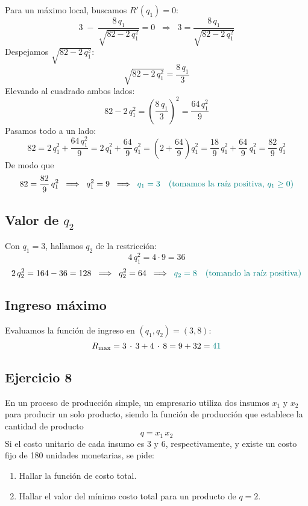 \documentclass{article}
\begin{document}
Para un máximo local, buscamos \(R'(q_1) = 0\):
\[
3 \;-\; \frac{8\,q_1}{\sqrt{82 - 2\,q_1^2}} = 0
\;\;\Longrightarrow\;\;
3 = \frac{8\,q_1}{\sqrt{82 - 2\,q_1^2}}
\]
Despejamos \(\sqrt{82 - 2\,q_1^2}\):
\[
\sqrt{82 - 2\,q_1^2} 
= \frac{8\,q_1}{3}
\]
Elevando al cuadrado ambos lados:
\[
82 - 2\,q_1^2 
= \left(\frac{8\,q_1}{3}\right)^2
= \frac{64\,q_1^2}{9}
\]
Pasamos todo a un lado:
\[
82 
= 2\,q_1^2 + \frac{64\,q_1^2}{9}
= 2\,q_1^2 + \frac{64}{9}\,q_1^2
= \left(2 + \frac{64}{9}\right) q_1^2
= \frac{18}{9}\,q_1^2 + \frac{64}{9}\,q_1^2
= \frac{82}{9}\,q_1^2
\]
De modo que
\[
82 
= \frac{82}{9}\,q_1^2
\;\;\Longrightarrow\;\;
q_1^2 = 9
\;\;\Longrightarrow\;\;
\color{teal} q_1 = 3
\quad (\text{tomamos la raíz positiva, }q_1 \ge 0)
\]

\subsection*{Valor de \(q_2\)}

Con \(q_1 = 3\), hallamos \(q_2\) de la restricción:
\[
4\,q_1^2 = 4 \cdot 9 = 36
\]
\[
2\,q_2^2 = 164 - 36 = 128
\;\;\Longrightarrow\;\;
q_2^2 = 64
\;\;\Longrightarrow\;\;
\color{teal} q_2 = 8
\quad (\text{tomando la raíz positiva})
\]

\subsection*{Ingreso máximo}

Evaluamos la función de ingreso en \((q_1, q_2) = (3, 8)\):
\[
R_{\max} = 3\,\cdot\,3 + 4\,\cdot\,8 = 9 + 32 = \color{teal} 41
\]



\newpage

\subsection{Ejercicio 8}


 En un proceso de producción simple, un empresario utiliza dos insumos \(x_1\) y \(x_2\) para producir un solo producto, 
siendo la función de producción que establece la cantidad de producto 
\[
q = x_1 \, x_2
\]
Si el costo unitario de cada insumo es 3 y 6, respectivamente, y existe un costo fijo de 180 unidades monetarias, se pide:

\begin{enumerate}
    \item Hallar la función de costo total.
    \item Hallar el valor del mínimo costo total para un producto de \(q = 2\).
\end{enumerate}
\end{document}
